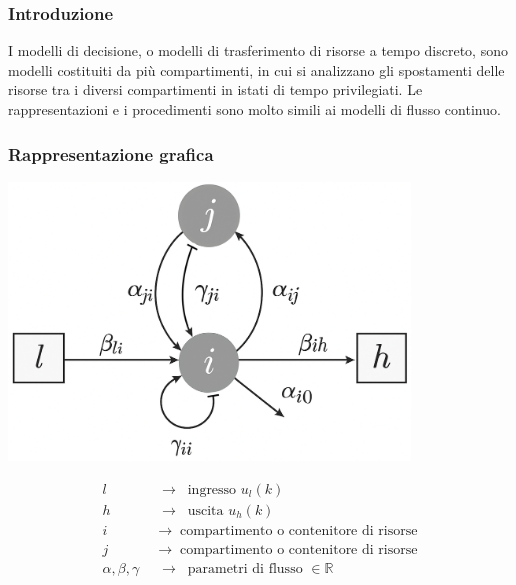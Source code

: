 \subsubsection*{Introduzione}
I modelli di decisione, o modelli di trasferimento di risorse a tempo discreto, sono modelli costituiti da più compartimenti,
in cui si analizzano gli spostamenti delle risorse tra i diversi compartimenti in istati di tempo privilegiati. Le rappresentazioni
e i procedimenti sono molto simili ai modelli di flusso continuo.

\subsubsection*{Rappresentazione grafica}
\begin{center}
	\begin{minipage}{0.4\textwidth}
		\centering
		\includegraphics[width=0.8\textwidth]{modelli/modello flusso continuo.png}
	\end{minipage}
	\begin{minipage}{0.5\textwidth}
		\begin{align*}
			l \;\; &\rightarrow \;\; \text{ingresso } u_l(k) \\
			h \;\; &\rightarrow \;\; \text{uscita } u_h(k) \\
			i \;\; &\rightarrow \;\; \text{compartimento o contenitore di risorse} \\
			j \;\; &\rightarrow \;\; \text{compartimento o contenitore di risorse} \\
			\alpha, \beta, \gamma \;\; &\rightarrow \;\; \text{parametri di flusso } \in \mathbb{R} 
		\end{align*}
	\end{minipage}

\end{center}
